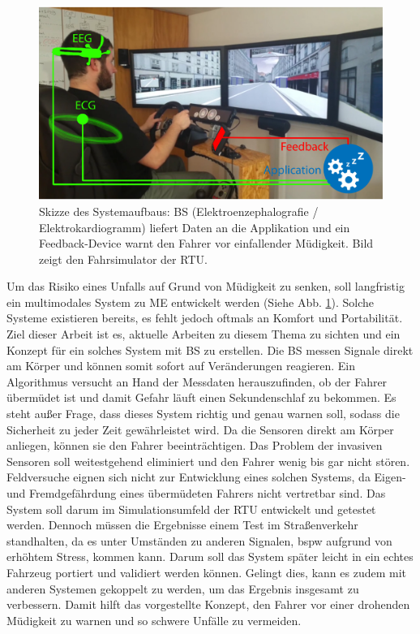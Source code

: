 {\begin{figure} 
  \begin{center}
    \includegraphics[width=12cm]{img/aufbau}
    \caption{Skizze des Systemaufbaus: \acl{BS} (Elektroenzephalografie / Elektrokardiogramm) liefert Daten an die Applikation und ein Feedback-Device warnt den Fahrer vor einfallender Müdigkeit. Bild zeigt den Fahrsimulator der \acl{RTU}.}
    \label{fig:sketch}
  \end{center}
\end{figure}

Um das Risiko eines Unfalls auf Grund von Müdigkeit zu senken, soll langfristig ein multimodales System zu \acl{ME} entwickelt werden (Siehe Abb. \ref{fig:sketch}). Solche Systeme existieren bereits, es fehlt jedoch oftmals an Komfort und Portabilität. Ziel dieser Arbeit ist es, aktuelle Arbeiten zu diesem Thema zu sichten und ein Konzept für ein solches System mit \acl{BS} zu erstellen. Die \acl{BS} messen Signale direkt am Körper und können somit sofort auf Veränderungen reagieren. Ein Algorithmus versucht an Hand der Messdaten herauszufinden, ob der Fahrer übermüdet ist und damit Gefahr läuft einen Sekundenschlaf zu bekommen. Es steht außer Frage, dass dieses System richtig und genau warnen soll, sodass die Sicherheit zu jeder Zeit gewährleistet wird. Da die Sensoren direkt am Körper anliegen, können sie den Fahrer beeinträchtigen. Das Problem der invasiven Sensoren soll weitestgehend eliminiert und den Fahrer wenig bis gar nicht stören. Feldversuche eignen sich nicht zur Entwicklung eines solchen Systems, da Eigen- und Fremdgefährdung eines übermüdeten Fahrers nicht vertretbar sind. Das System soll darum im Simulationsumfeld der \acl{RTU} entwickelt und getestet werden. Dennoch müssen die Ergebnisse einem Test im Straßenverkehr standhalten, da es unter Umständen zu anderen Signalen, \acl{bspw} aufgrund von erhöhtem Stress, kommen kann. Darum soll das System später leicht in ein echtes Fahrzeug portiert und validiert werden können. Gelingt dies, kann es zudem mit anderen Systemen gekoppelt zu werden, um das Ergebnis insgesamt zu verbessern. Damit hilft das vorgestellte Konzept, den Fahrer vor einer drohenden Müdigkeit zu warnen und so schwere Unfälle zu vermeiden.\\ 

}
